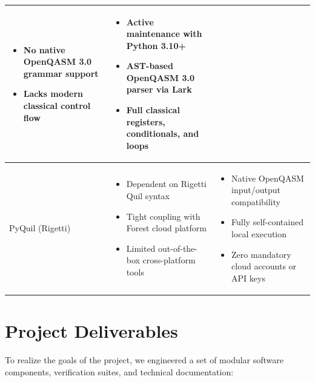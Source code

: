 \begin{table}[h!]
\begin{tabularx}{\textwidth}{|p{3cm}|X|X|}
\begin{itemize}[leftmargin=*, noitemsep, topsep=0pt]
    \item No native OpenQASM 3.0 grammar support
    \item Lacks modern classical control flow
\end{itemize}
&
\begin{itemize}[leftmargin=*, noitemsep, topsep=0pt]
    \item Active maintenance with Python 3.10+
    \item AST-based OpenQASM 3.0 parser via Lark
    \item Full classical registers, conditionals, and loops
\end{itemize}
\\
\hline
PyQuil (Rigetti) &
\begin{itemize}[leftmargin=*, noitemsep, topsep=0pt]
    \item Dependent on Rigetti Quil syntax
    \item Tight coupling with Forest cloud platform
    \item Limited out-of-the-box cross-platform tools
\end{itemize}
&
\begin{itemize}[leftmargin=*, noitemsep, topsep=0pt]
    \item Native OpenQASM input/output compatibility
    \item Fully self-contained local execution
    \item Zero mandatory cloud accounts or API keys
\end{itemize}
\\
\hline
\end{tabularx}
\end{table}


\section{Project Deliverables}

To realize the goals of the project, we engineered a set of modular software components, verification suites, and technical documentation:

